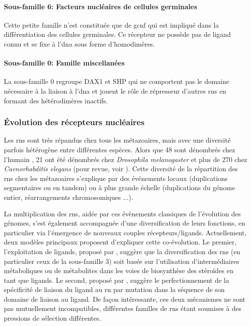 \documentclass[../main.tex]{subfiles}
\begin{document}
\paragraph{Sous-famille 6: Facteurs nucléaires de cellules germinales}
Cette petite famille n'est constituée que de \gls{gcnf} qui est impliqué dans la différentiation des cellules germinales.
Ce récepteur ne possède pas de ligand connu et se fixe à l'\gls{dna} sous forme d'homodimères.

\paragraph{Sous-famille 0: Famille miscellanées}
La sous-famille 0 regroupe DAX1 et SHP qui ne comportent pas le domaine nécessaire à la liaison à l'\gls{dna} et jouent le rôle de répresseur d'autres \glspl{rn} en formant des hétérodimères inactifs.
\par

\subsubsection{Évolution des récepteurs nucléaires}
Les \glspl{rn} sont très répandus chez tous les métazoaires, mais avec une diversité parfois hétérogène entre différentes espèces.
Alors que 48 sont dénombrés chez l'humain \citep{Robinson-Rechavi2001}, 21 ont été dénombrés chez \textit{Drosophila melanogaster} et plus de 270 chez \textit{Caenorhabditis elegans} (pour revue, voir \citealp{Robinson-Rechavi2003}).
Cette diversité de la répartition des \glspl{rn} chez les métazoaires s'explique par des événements locaux (duplications segmentaires ou en tandem) ou à plus grande échelle (duplications du génome entier, réarrangements chromosomiques ...).
\par
La multiplication des \glspl{rn}, aidée par ces évènements classiques de l'évolution des génomes, s'est également accompagnée d'une diversification de leurs fonctions, en particulier via l'émergence de nouveaux couples récepteurs/ligands.
Actuellement, deux modèles principaux proposent d'expliquer cette co-évolution.
Le premier, l'exploitation de ligands, proposé par \citet{Thornton2001}, suggère que la diversification des \glspl{rn} (en particulier ceux de la sous-famille 3) soit basée sur l'utilisation d'intermédiaires métaboliques ou de métabolites dans les voies de biosynthèse des stéroïdes en tant que ligands.
Le second, proposé par \citet{Escriva2006}, suggère le perfectionnement de la spécificité de liaison du ligand au \gls{rn} par mutation dans la séquence de son domaine de liaison au ligand.
De façon intéressante, ces deux mécanismes ne sont pas mutuellement incompatibles, différentes familles de \glspl{rn} étant soumises à des pressions de sélection différentes.
\end{document}
